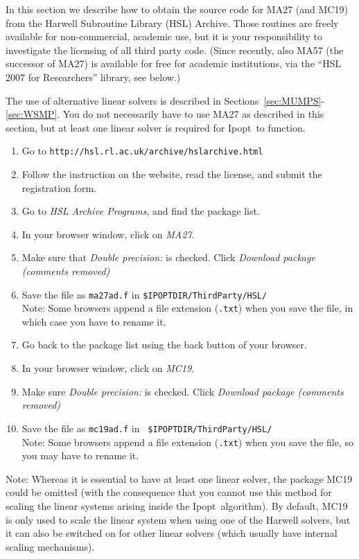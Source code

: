 \documentclass[10pt]{article}
\newcommand{\Ipopt}{{\sc Ipopt}}
\begin{document}
In this section we describe how to obtain the source code for MA27
(and MC19) from the Harwell Subroutine Library (HSL) Archive.  Those
routines are freely available for non-commercial, academic use, but it
is your responsibility to investigate the licensing of all third party
code.  (Since recently, also MA57 (the successor of MA27) is available
for free for academic institutions, via the ``HSL 2007 for
Researchers'' library, see below.)

The use of alternative linear solvers is described in
Sections~\ref{sec:MUMPS}-\ref{sec:WSMP}.  You do not necessarily
have to use MA27 as described in this section, but at least one linear
solver is required for \Ipopt\ to function.

\begin{enumerate}
\item Go to {\tt http://hsl.rl.ac.uk/archive/hslarchive.html}
\item Follow the instruction on the website, read the license, and
  submit the registration form.
\item Go to \textit{HSL Archive Programs}, and find the package list.
\item In your browser window, click on \textit{MA27}.
\item Make sure that \textit{Double precision:} is checked. 
  Click \textit{Download package (comments removed)}
\item Save the file as {\tt ma27ad.f} in {\tt \$IPOPTDIR/ThirdParty/HSL/}\\
  Note: Some browsers append a file extension ({\tt .txt}) when you save
  the file, in which case you have to rename it.
\item Go back to the package list using the back button of your browser.
\item In your browser window, click on \textit{MC19}.
\item Make sure \textit{Double precision:} is checked. Click 
  \textit{Download package (comments removed)}
\item Save the file as {\tt mc19ad.f} in {\tt
    \$IPOPTDIR/ThirdParty/HSL/}\\
  Note: Some browsers append a file extension ({\tt .txt}) when you save
  the file, so you may have to rename it.
\end{enumerate}

Note: Whereas it is essential to have at least one linear solver, the
package MC19 could be omitted (with the consequence that you cannot
use this method for scaling the linear systems arising inside the
\Ipopt\ algorithm).  By default, MC19 is only used to scale the linear
system when using one of the Harwell solvers, but it can also be
switched on for other linear solvers (which usually have internal
scaling mechanisms).
\end{document}
